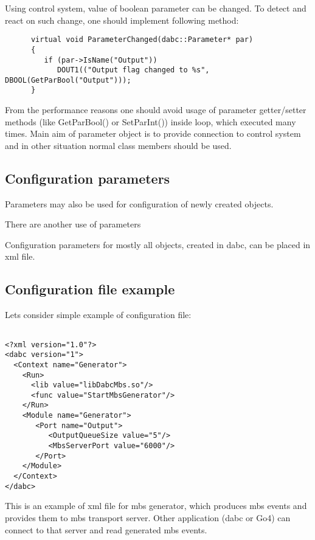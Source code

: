 Using control system, value of boolean parameter can be changed. To detect and react on such change,
one should implement following method: 
 
\begin{verbatim}
      virtual void ParameterChanged(dabc::Parameter* par) 
      {
         if (par->IsName("Output")) 
            DOUT1(("Output flag changed to %s", DBOOL(GetParBool("Output")));
      }
\end{verbatim}

From the performance reasons one should avoid usage of parameter getter/setter methods (like  
GetParBool() or SetParInt()) inside loop, which executed many times. Main aim of parameter
object is to provide connection to control system and in other situation normal class members should be used.


\subsection{Configuration parameters}


Parameters may also be used for configuration of newly created objects.



There are another use of parameters 

Configuration parameters for mostly all objects, created in dabc, 
can be placed in xml file. 



\subsection{Configuration file example}

Lets consider simple example of configuration file:

\begin{verbatim}

<?xml version="1.0"?>
<dabc version="1">
  <Context name="Generator">
    <Run>
      <lib value="libDabcMbs.so"/>
      <func value="StartMbsGenerator"/>
    </Run>
    <Module name="Generator">
       <Port name="Output">
          <OutputQueueSize value="5"/>
          <MbsServerPort value="6000"/>
       </Port>
    </Module>
  </Context>
</dabc>

\end{verbatim}

This is an example of xml file for mbs generator, which produces 
mbs events and provides them to mbs transport server. Other application
(dabc or Go4) can connect to that server and read generated mbs events.

